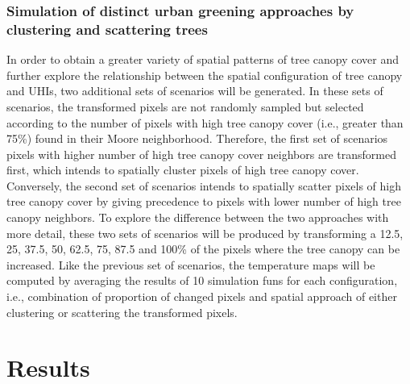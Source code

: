 \documentclass[10pt,letterpaper]{article}
\begin{document}
\subsubsection*{Simulation of distinct urban greening approaches by clustering and scattering trees}

In order to obtain a greater variety of spatial patterns of tree canopy cover and further explore the relationship between the spatial configuration of tree canopy and UHIs, two additional sets of scenarios will be generated.
In these sets of scenarios, the transformed pixels are not randomly sampled but selected according to the number of pixels with high tree canopy cover (i.e., greater than 75\%) found in their Moore neighborhood.
Therefore, the first set of scenarios pixels with higher number of high tree canopy cover neighbors are transformed first, which intends to spatially cluster pixels of high tree canopy cover. Conversely, the second set of scenarios intends to spatially scatter pixels of high tree canopy cover by giving precedence to pixels with lower number of high tree canopy neighbors.
To explore the difference between the two approaches with more detail, these two sets of scenarios will be produced by transforming a 12.5, 25, 37.5, 50, 62.5, 75, 87.5 and 100\% of the pixels where the tree canopy can be increased.
Like the previous set of scenarios, the temperature maps will be computed by averaging the results of 10 simulation funs for each configuration, i.e., combination of proportion of changed pixels and spatial approach of either clustering or scattering the transformed pixels.


\section*{Results}

\end{document}
